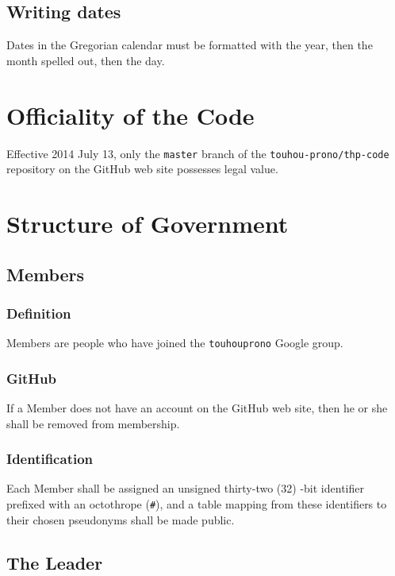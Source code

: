 \documentclass[10pt]{book}
\begin{document}
\section{Writing dates}

Dates in the Gregorian calendar must be formatted with the year, then the month spelled out, then the day.

\chapter{Officiality of the Code}

Effective 2014 July 13, only the \texttt{master} branch of the \texttt{touhou-prono/thp-code} repository on the GitHub web site possesses legal value.

\chapter{Structure of Government}

\section{Members}

\subsection{Definition}

Members are people who have joined the \texttt{touhouprono} Google group.

\subsection{GitHub}

If a Member does not have an account on the GitHub web site, then he or she shall be removed from membership.

\subsection{Identification}

Each Member shall be assigned an unsigned thirty-two (32) -bit identifier prefixed with an octothrope (\texttt{\#}), and a table mapping from these identifiers to their chosen pseudonyms shall be made public.

\section{The Leader}
\end{document}

